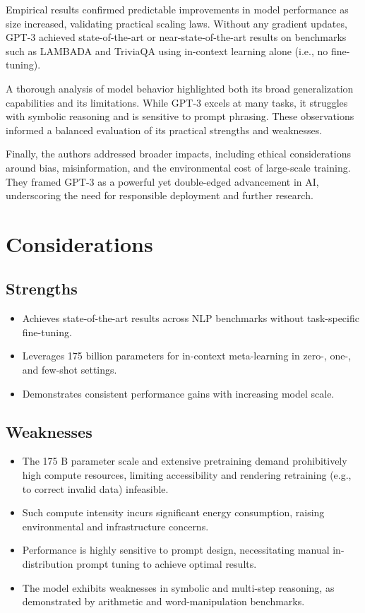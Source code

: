 \documentclass[10pt]{article}
\begin{document}
Empirical results confirmed predictable improvements in model performance as size increased, validating practical scaling laws. Without any gradient updates, GPT-3 achieved state-of-the-art or near-state-of-the-art results on benchmarks such as LAMBADA and TriviaQA using in-context learning alone (i.e., no fine-tuning).

A thorough analysis of model behavior highlighted both its broad generalization capabilities and its limitations. While GPT-3 excels at many tasks, it struggles with symbolic reasoning and is sensitive to prompt phrasing. These observations informed a balanced evaluation of its practical strengths and weaknesses.

Finally, the authors addressed broader impacts, including ethical considerations around bias, misinformation, and the environmental cost of large-scale training. They framed GPT-3 as a powerful yet double-edged advancement in AI, underscoring the need for responsible deployment and further research.

\section*{Considerations}
\subsection*{Strengths}
\begin{itemize}
    \item Achieves state-of-the-art results across NLP benchmarks without task-specific fine-tuning.
    \item Leverages 175 billion parameters for in-context meta-learning in zero-, one-, and few-shot settings.
    \item Demonstrates consistent performance gains with increasing model scale.
\end{itemize}
\subsection*{Weaknesses}
\begin{itemize}
    \item The 175 B parameter scale and extensive pretraining demand prohibitively high compute resources, limiting accessibility and rendering retraining (e.g., to correct invalid data) infeasible.
    \item Such compute intensity incurs significant energy consumption, raising environmental and infrastructure concerns.
    \item Performance is highly sensitive to prompt design, necessitating manual in-distribution prompt tuning to achieve optimal results.
    \item The model exhibits weaknesses in symbolic and multi-step reasoning, as demonstrated by arithmetic and word-manipulation benchmarks.
\end{itemize}
\end{document}
